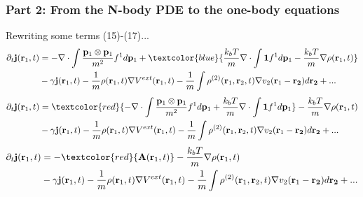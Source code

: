 \documentclass[aspectratio=169,xcolor=dvipsnames]{beamer}
\begin{document}
\begin{frame}
	\frametitle{Part 2: From the N-body PDE to the one-body equations}
	\vspace{0.2cm}
	Rewriting some terms (15)-(17)...
	\begin{align*}
	\partial_t \mathbf{j}(\mathbf{r}_1,t) &= - \nabla \cdot \int \frac{\mathbf{p}_1 \otimes \mathbf{p}_1}{m^2} f^1 d \mathbf{p}_1 + \textcolor{blue}{\frac{k_bT}{m} \nabla \cdot \int  \mathbf{1}f^1 d\mathbf{p}_1  -\frac{k_bT}{m} \nabla \rho (\mathbf{r}_1,t)}\\
	&- \gamma \mathbf{j}(\mathbf{r}_1,t) -\frac{1}{m} \rho(\mathbf{r}_1,t) \nabla V^{ext}(\mathbf{r}_1,t) - \frac{1}{m} \int \rho^{(2)}(\mathbf{r}_1, \mathbf{r}_2,t) \nabla v_2(\mathbf{r}_1 - \mathbf{r_2}) d \mathbf{r_2} + ...
	\end{align*}
	\begin{align*}
	\partial_t \mathbf{j}(\mathbf{r}_1,t) &= \textcolor{red}{- \nabla \cdot \int \frac{\mathbf{p}_1 \otimes \mathbf{p}_1}{m^2} f^1 d \mathbf{p}_1 + \frac{k_bT}{m} \nabla \cdot \int  \mathbf{1}f^1 d\mathbf{p}_1}  -\frac{k_bT}{m} \nabla \rho (\mathbf{r}_1,t)\\
	&- \gamma \mathbf{j}(\mathbf{r}_1,t) -\frac{1}{m} \rho(\mathbf{r}_1,t) \nabla V^{ext}(\mathbf{r}_1,t) - \frac{1}{m} \int \rho^{(2)}(\mathbf{r}_1, \mathbf{r}_2,t) \nabla v_2(\mathbf{r}_1 - \mathbf{r_2}) d \mathbf{r_2} + ...
	\end{align*}
	\begin{align*}
	\partial_t \mathbf{j}(\mathbf{r}_1,t) &=- \textcolor{red}{\mathbf{A}(\mathbf{r}_1,t)}  -\frac{k_bT}{m} \nabla \rho (\mathbf{r}_1,t)\\
	&- \gamma \mathbf{j}(\mathbf{r}_1,t) -\frac{1}{m} \rho(\mathbf{r}_1,t) \nabla V^{ext}(\mathbf{r}_1,t) - \frac{1}{m} \int \rho^{(2)}(\mathbf{r}_1, \mathbf{r}_2,t) \nabla v_2(\mathbf{r}_1 - \mathbf{r_2}) d \mathbf{r_2} + ...
	\end{align*}
\end{frame}
\end{document}
